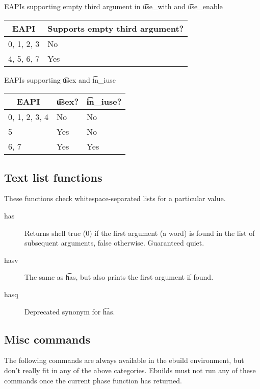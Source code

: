 \begin{centertable}{EAPIs supporting empty third argument in \t{use_with} and \t{use_enable}}
    \label{tab:use-with-third-arg}
    \begin{tabular}{ll}
      \toprule
      \multicolumn{1}{c}{\textbf{EAPI}} &
      \multicolumn{1}{c}{\textbf{Supports empty third argument?}} \\
      \midrule
      0, 1, 2, 3        & No  \\
      4, 5, 6, 7        & Yes \\
      \bottomrule
    \end{tabular}
\end{centertable}

\begin{centertable}{EAPIs supporting \t{usex} and \t{in_iuse}}
    \label{tab:use-list-functions}
    \begin{tabular}{lll}
      \toprule
      \multicolumn{1}{c}{\textbf{EAPI}} &
      \multicolumn{1}{c}{\textbf{\t{usex}?}} &
      \multicolumn{1}{c}{\textbf{\t{in_iuse}?}} \\
      \midrule
      0, 1, 2, 3, 4     & No  & No  \\
      5                 & Yes & No  \\
      6, 7              & Yes & Yes \\
      \bottomrule
    \end{tabular}
\end{centertable}

\subsection{Text list functions}
These functions check whitespace-separated lists for a particular value.

\begin{description}
\item[has] Returns shell true (0) if the first argument (a word) is found in the list of subsequent
    arguments, false otherwise. Guaranteed quiet.
\item[hasv] The same as \t{has}, but also prints the first argument if found.
\item[hasq] Deprecated synonym for \t{has}.
\end{description}

\subsection{Misc commands}
The following commands are always available in the ebuild environment, but don't really fit in any
of the above categories. Ebuilds must not run any of these commands once the current phase function
has returned.

